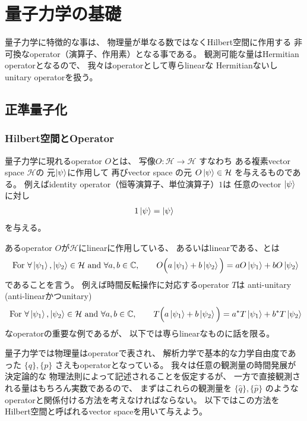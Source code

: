 \section{量子力学の基礎}

量子力学に特徴的な事は、
物理量が単なる数ではなくHilbert空間に作用する
非可換なoperator（演算子、作用素）となる事である。
観測可能な量はHermitian operatorとなるので、
我々はoperatorとして専らlinearな
Hermitianないしunitary operatorを扱う。

\subsection{正準量子化}

\subsubsection{Hilbert空間とOperator}

量子力学に現れるoperator $O$とは、
写像$O: \mathcal{H} \to \mathcal{H}$
すなわち
ある複素vector space $\mathcal{H}$の
元$\ket{\psi}$に作用して
再びvector space の元
$O\ket{\psi} \in \mathcal{H}$
を与えるものである。
例えばidentity operator（恒等演算子、単位演算子）$1$は
任意のvector $\ket{\psi}$に対し
\begin{align}
    1 \ket{\psi} = \ket{\psi}
\end{align}
を与える。

あるoperator $O$が$\mathcal{H}$にlinearに作用している、
あるいはlinearである、とは
\begin{align}
    \text{ For }
        \forall \ket{\psi_1}, \ket{\psi_2}
        \in \mathcal{H}
    \text{ and }
        \forall a,b\in \mathbb{C}
    ,\qquad
        O\Big(
            a \ket{\psi_1}
            +
            b \ket{\psi_2}
        \Big)
    =
        a O \ket{\psi_1}
        +
        b O \ket{\psi_2}
\end{align}
であることを言う。
例えば時間反転操作に対応するoperator $T$は
anti-unitary (anti-linearかつunitary)
\begin{align}
    \text{ For }
        \forall \ket{\psi_1}, \ket{\psi_2}
        \in \mathcal{H}
    \text{ and }
        \forall a,b\in \mathbb{C}
    ,\qquad
        T\Big(
            a \ket{\psi_1}
            +
            b \ket{\psi_2}
        \Big)
    =
        a^* T \ket{\psi_1}
        +
        b^* T \ket{\psi_2}
\end{align}
なoperatorの重要な例であるが、
以下では専らlinearなものに話を限る。

量子力学では物理量はoperatorで表され、
解析力学で基本的な力学自由度であった
$\{q\},\{p\}$
さえもoperatorとなっている。
我々は任意の観測量の時間発展が決定論的な
物理法則によって記述されることを仮定するが、
一方で直接観測される量はもちろん実数であるので、
まずはこれらの観測量を
$\{\hat{q}\},\{\hat{p}\}$
のようなoperatorと関係付ける方法を考えなければならない。
以下ではこの方法を
Hilbert空間と呼ばれるvector spaceを用いて与えよう。

